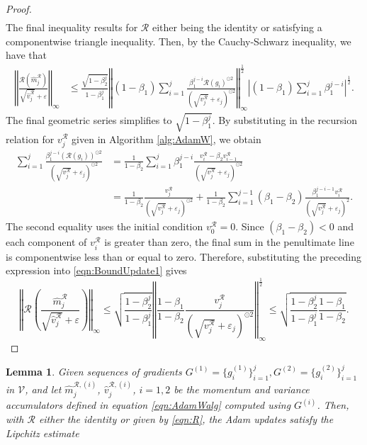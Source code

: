 \documentclass{article}
\newtheorem{lemma}[theorem]{Lemma}
\begin{document}
\begin{appendices}
\begin{proof}
\begin{align*}
\end{align*}
The final inequality results for $\mathcal R$ either being the identity or satisfying a componentwise triangle inequality.
Then, by the Cauchy-Schwarz inequality, we have that
\begin{align}\label{eqn:BoundUpdate1}
   \left\Vert \frac{\mathcal R\left(\hat m^\mathcal R_j\right)}{\sqrt{\hat v^\mathcal R_j}+\varepsilon} \right\Vert_\infty &\le \frac{\sqrt{1-\beta_2^j}}{1-\beta_1^j}\left\Vert(1-\beta_1)\sum_{i=1}^j \frac{\beta_1^{j-i}\mathcal R( g_i)^{\odot 2}}{\left(\sqrt{v^\mathcal R_j}+\varepsilon_j\right)^{\odot 2}}\right\Vert_\infty^{\frac{1}{2}}\left\vert(1-\beta_1)\sum_{i=1}^j\beta_1^{j-i}\right\vert^{\frac{1}{2}}.
\end{align}
The final geometric series simplifies to $\sqrt{1-\beta_1^j}$.
By substituting in the recursion relation for $v^\mathcal R_j$ given in Algorithm \ref{alg:AdamW}, we obtain
\begin{align*}
   \sum_{i=1}^j \frac{\beta_1^{j-i}(\mathcal R (g_i))^{\odot 2}}{(\sqrt{v^\mathcal R_j}+\varepsilon_j)^{\odot 2}}&=\frac{1}{1-\beta_2}\sum_{i=1}^j \beta_1^{j-i}\frac{v^\mathcal R_i-\beta_2v^\mathcal R_{i-1}}{(\sqrt{v^\mathcal R_j}+\varepsilon_j)^{\odot 2}}\\
    &= \frac{1}{1-\beta_2}\frac{v^\mathcal R_j}{(\sqrt{v^\mathcal R_j}+\varepsilon_j)^{\odot 2}}+\frac{1}{1-\beta_2}\sum_{i=1}^{j-1}(\beta_1-\beta_2) \frac{\beta_1^{j-i-1} v^\mathcal R_i}{(\sqrt{v^\mathcal{R}_j}+\varepsilon_j)^2}.
\end{align*}
The second equality uses the initial condition $v^\mathcal R_0=0$. Since $(\beta_1-\beta_2)<0$ and each component of $v^\mathcal R_i$ is greater than zero, the final sum in the penultimate line is componentwise less than or equal to zero. Therefore, substituting the preceding expression into  \eqref{eqn:BoundUpdate1} gives
\[
\left\Vert \mathcal R\left(\frac{\hat m^\mathcal R_j}{\sqrt{\hat v^\mathcal R_j}+\varepsilon}\right) \right\Vert_\infty\le \sqrt{\frac{1-\beta_2^j}{1-\beta_1^j}}\left\Vert \frac{1-\beta_1}{1-\beta_2}\frac{v^\mathcal R_j}{\left(\sqrt{v^\mathcal R_j}+\varepsilon_j\right)^{\odot 2}} \right\Vert_\infty^{\frac{1}{2}}\le \sqrt{\frac{1-\beta_2^j}{1-\beta_1^j}\frac{1-\beta_1}{1-\beta_2}}.
\]
\end{proof}
\begin{lemma}\label{lemma:UpdateStability}
Given sequences of gradients $G^{(1)}=\{g^{(1)}_i\}_{i=1}^j,G^{(2)}=\{ g^{(2)}_i\}_{i=1}^j $ in $\mathscr{V}$, and let $\hat m^{\mathcal R,(i)}_j$, $\hat v^{\mathcal R,(i)}_j$, $i=1,2$ be the momentum and variance accumulators defined in equation \eqref{eqn:AdamWalg} computed using $G^{(i)}$. Then, with $\mathcal R$ either the identity or given by \eqref{eqn:R}, the Adam updates satisfy the Lipchitz estimate

\end{lemma}
\end{appendices}
\end{document}
